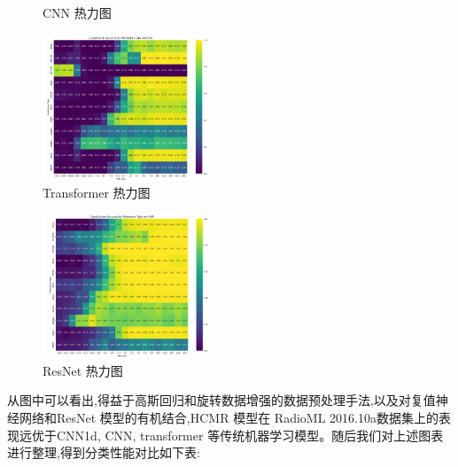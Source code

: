 \documentclass{article}
\begin{document}
\begin{CJK}{UTF8}{gbsn}
\begin{figure}[H]
    \caption{CNN 热力图}
    \label{fig:traditional_model_heatmap_cnn}
\end{figure}
\begin{figure}[H]
    \centering
    \includegraphics[width=0.45\textwidth]{figure/image18.png}
    \caption{Transformer 热力图}
    \label{fig:traditional_model_heatmap_transformer}
\end{figure}
\begin{figure}[H]
    \centering
    \includegraphics[width=0.45\textwidth]{figure/image19.png}
    \caption{ResNet 热力图}
    \label{fig:traditional_model_heatmap_resnet}
\end{figure}
从图中可以看出,得益于高斯回归和旋转数据增强的数据预处理手法,以及对复值神经网络和ResNet 模型的有机结合,HCMR 模型在 RadioML 2016.10a数据集上的表现远优于CNN1d, CNN, transformer 等传统机器学习模型。随后我们对上述图表进行整理,得到分类性能对比如下表:


\end{CJK}
\end{document}
